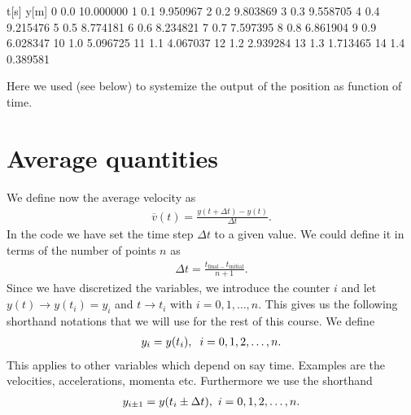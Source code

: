 \documentclass[letterpaper,10pt,english]{sphinxmanual}
\begin{document}
\begin{sphinxVerbatim}[commandchars=\\\{\}]
    t[s]       y[m]
0    0.0  10.000000
1    0.1   9.950967
2    0.2   9.803869
3    0.3   9.558705
4    0.4   9.215476
5    0.5   8.774181
6    0.6   8.234821
7    0.7   7.597395
8    0.8   6.861904
9    0.9   6.028347
10   1.0   5.096725
11   1.1   4.067037
12   1.2   2.939284
13   1.3   1.713465
14   1.4   0.389581
\end{sphinxVerbatim}

\noindent{}

Here we used  (see below) to systemize the output of the position as function of time.


\section{Average quantities}
\label{\detokenize{chapter1:average-quantities}}
We define now the average velocity as
\begin{equation*}
\begin{split}
\overline{v}(t) = \frac{y(t+\Delta t)-y(t)}{\Delta t}.
\end{split}
\end{equation*}
In the code we have set the time step \(\Delta t\) to a given value. We could define it in terms of the number of points \(n\) as
\begin{equation*}
\begin{split}
\Delta t = \frac{t_{\mathrm{final}-}t_{\mathrm{initial}}}{n+1}.
\end{split}
\end{equation*}
Since we have discretized the variables, we introduce the counter \(i\) and let \(y(t)\rightarrow y(t_i)=y_i\) and \(t\rightarrow t_i\)
with \(i=0,1,\dots, n\). This gives us the following shorthand notations that we will use for the rest of this course. We define
\begin{equation*}
\begin{split}
y_i = y(t_i),\hspace{0.2cm} i=0,1,2,\dots,n.
\end{split}
\end{equation*}
This applies to other variables which depend on say time. Examples are the velocities, accelerations, momenta etc.
Furthermore we use the shorthand
\begin{equation*}
\begin{split}
y_{i\pm 1} = y(t_i\pm \Delta t),\hspace{0.12cm} i=0,1,2,\dots,n.
\end{split}
\end{equation*}
\end{document}
